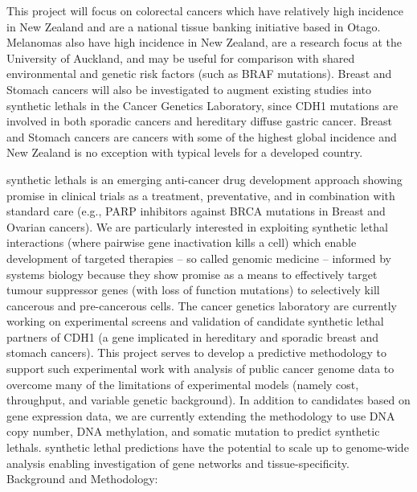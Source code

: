 This project will focus on colorectal cancers which have relatively high incidence in New Zealand and are a national tissue banking initiative based in Otago. Melanomas also have high incidence in New Zealand, are a research focus at the University of Auckland, and may be useful for comparison with shared environmental and genetic risk factors (such as BRAF mutations). Breast and Stomach cancers will also be investigated to augment existing studies into \glspl{synthetic lethal} in the Cancer Genetics Laboratory, since CDH1 mutations are involved in both sporadic cancers and hereditary diffuse gastric cancer. Breast and Stomach cancers are cancers with some of the highest global incidence and New Zealand is no exception with typical levels for a developed country.



\Glspl{synthetic lethal} is an emerging anti-cancer drug development approach showing promise in clinical trials as a treatment, preventative, and in combination with standard care (e.g., PARP inhibitors against BRCA mutations in Breast and Ovarian cancers). We are particularly interested in exploiting \gls{synthetic lethal} interactions (where pairwise gene inactivation kills a cell) which enable development of targeted therapies – so called genomic medicine – informed by systems biology because they show promise as a means to effectively target tumour suppressor genes (with loss of function mutations) to selectively kill cancerous and pre-cancerous cells. The cancer genetics laboratory are currently working on experimental screens and validation of candidate \gls{synthetic lethal} partners of CDH1 (a gene implicated in hereditary and sporadic breast and stomach cancers). This project serves to develop a predictive methodology to support such experimental work with analysis of public cancer genome data to overcome many of the limitations of experimental models (namely cost, throughput, and variable genetic background). In addition to candidates based on gene expression data, we are currently extending the methodology to use DNA copy number, DNA methylation, and somatic mutation to predict \glspl{synthetic lethal}. \Gls{synthetic lethal} predictions have the potential to scale up to genome-wide analysis enabling investigation of gene networks and tissue-specificity.
Background and Methodology:

